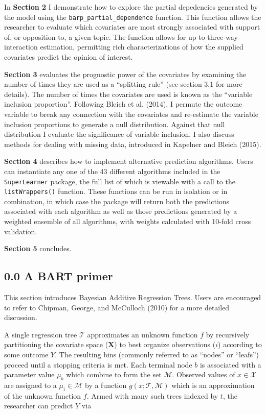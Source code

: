 \documentclass[]{article}
\begin{document}
In \textbf{Section 2} I demonstrate how to explore the partial
depedencies generated by the model using the
\texttt{barp\_partial\_dependence} function. This function allows the
researcher to evaluate which covariates are most strongly associated
with support of, or opposition to, a given topic. The function allows
for up to three-way interaction estimation, permitting rich
characterizations of how the supplied covariates predict the opinion of
interest.

\textbf{Section 3} evaluates the prognostic power of the covariates by
examining the number of times they are used as a ``splitting rule'' (see
section 3.1 for more details). The number of times the covariates are
used is known as the ``variable inclusion proportion''. Following Bleich
et al. (2014), I permute the outcome variable to break any connection
with the covariates and re-estimate the variable inclusion proportions
to generate a null distribution. Against that null distribution I
evaluate the significance of variable inclusion. I also discuss methods
for dealing with missing data, introduced in Kapelner and Bleich (2015).

\textbf{Section 4} describes how to implement alternative prediction
algorithms. Users can instantiate any one of the 43 different algorithms
included in the \texttt{SuperLearner} package, the full list of which is
viewable with a call to the \texttt{listWrappers()} function. These
functions can be run in isolation or in combination, in which case the
package will return both the predictions associated with each algorithm
as well as those predictions generated by a weighted ensemble of all
algorithms, with weights calculated with 10-fold cross validation.

\textbf{Section 5} concludes.

\subsection{0.0 A BART primer}\label{a-bart-primer}

This section introduces Bayesian Additive Regression Trees. Users are
encouraged to refer to Chipman, George, and McCulloch (2010) for a more
detailed discussion.

A single regression tree \(\mathcal{T}\) approximates an unknown
function \(f\) by recursively partitioning the covariate space
(\(\mathbf{X}\)) to best organize observations (\(i\)) according to some
outcome \(Y\). The resulting bins (commonly referred to as ``nodes'' or
``leafs'') proceed until a stopping criteria is met. Each terminal node
\(b\) is associated with a parameter value \(\mu_b\) which combine to
form the set \(\mathcal{M}\). Observed values of \(x \in \mathcal{X}\)
are assigned to a \(\mu_i \in \mathcal{M}\) by a function
\(g(x; \mathcal{T},\mathcal{M})\) which is an approximation of the
unknown function \(f\). Armed with many such trees indexed by \(t\), the
researcher can predict \(Y\) via
\end{document}
